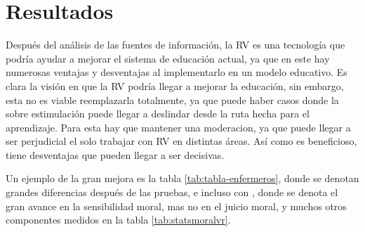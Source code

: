 \section{Resultados}

Después del análisis de las fuentes de información, la RV es una tecnología que podría ayudar a mejorar el sistema de educación actual, ya que en este hay numerosas ventajas y desventajas al implementarlo en un modelo educativo.
Es clara la visión en que la RV podría llegar a mejorar la educación, sin embargo, esta no es viable reemplazarla totalmente, ya que puede haber casos donde la sobre estimulación puede llegar a deslindar desde la ruta hecha para el aprendizaje. Para esta hay que mantener una moderacion, ya que puede llegar a ser perjudicial el solo trabajar con RV en distintas \'areas. As\'i como es beneficioso, tiene desventajas que pueden llegar a ser decisivas.

Un ejemplo de la gran mejora es la tabla \ref{tab:tabla-enfermeros}, donde se denotan grandes diferencias despu{\'e}s de las pruebas, e incluso con \textcite{SHIM2023100010}, donde se denota el gran avance en la sensibilidad moral, mas no en el juicio moral, y muchos otros componentes medidos en la tabla \ref{tab:statsmoralvr}.
